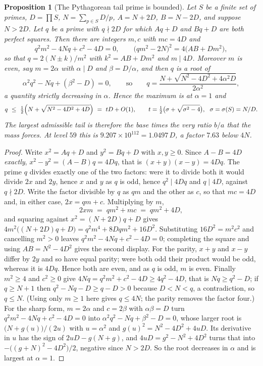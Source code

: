\documentclass[11pt]{article}
\newtheorem{proposition}[theorem]{Proposition}
\theoremstyle{definition}
\begin{document}
\begin{proposition}[The Pythagorean tail prime is bounded]\label{prop:tailbound}
Let $S$ be a finite set of primes, $D=\prod S$, $N=\sum_{p\in S}D/p$, $A=N+2D$, $B=N-2D$, and suppose
$N>2D$. Let $q$ be a prime with $q\nmid 2D$ for which $Aq+D$ and $Bq+D$ are both perfect squares. Then
there are integers $m,c$ with $mc=4D$ and
\[ q^2m^2-4Nq+c^2-4D=0, \qquad \bigl(qm^2-2N\bigr)^2=4\bigl(AB+Dm^2\bigr), \]
so that $q=2(N\pm k)/m^2$ with $k^2=AB+Dm^2$ and $m\mid 4D$. Moreover $m$ is \emph{even}, say
$m=2\alpha$ with $\alpha\mid D$ and $\beta=D/\alpha$, and then $q$ is a root of
\[ \alpha^2q^2-Nq+(\beta^2-D)=0, \qquad\text{so}\qquad
   q=\frac{N+\sqrt{N^2-4D^2+4\alpha^2D}}{2\alpha^2}, \]
a quantity strictly decreasing in $\alpha$. Hence the maximum is at $\alpha=1$ and
\[ q\ \le\ \tfrac12\Bigl(N+\sqrt{N^{2}-4D^{2}+4D}\Bigr)\ =\ tD+O(1),
   \qquad t=\tfrac12\bigl(\sigma+\sqrt{\sigma^{2}-4}\bigr),\ \ \sigma=\sigma(S)=N/D. \]
The largest admissible tail is therefore the base times the very ratio $b/a$ that the mass forces.
At level $59$ this is $9.207\times10^{112}=1.0497\,D$, a factor $7.63$ below $4N$.
\end{proposition}

\begin{proof}
Write $x^2=Aq+D$ and $y^2=Bq+D$ with $x,y\ge0$. Since $A-B=4D$ \emph{exactly},
$x^2-y^2=(A-B)q=4Dq$, that is $(x+y)(x-y)=4Dq$. The prime $q$ divides exactly one of the two factors:
were it to divide both it would divide $2x$ and $2y$, hence $x$ and $y$ as $q$ is odd, hence
$q^2\mid 4Dq$ and $q\mid 4D$, against $q\nmid2D$. Write the factor divisible by $q$ as $qm$ and the
other as $c$, so that $mc=4D$ and, in either case, $2x=qm+c$. Multiplying by $m$,
\[ 2xm\;=\;qm^2+mc\;=\;qm^2+4D, \]
and squaring against $x^2=(N+2D)q+D$ gives
$4m^2\bigl((N+2D)q+D\bigr)=q^2m^4+8Dqm^2+16D^2$. Substituting $16D^2=m^2c^2$ and cancelling $m^2>0$
leaves $q^2m^2-4Nq+c^2-4D=0$; completing the square and using $AB=N^2-4D^2$ gives the second display.
For the parity, $x+y$ and $x-y$ differ by $2y$ and so have equal parity; were both odd their
product would be odd, whereas it is $4Dq$. Hence both are even, and as $q$ is odd, $m$ is even.
Finally $m^2\ge4$ and $c^2\ge0$ give $4Nq=q^2m^2+c^2-4D\ge 4q^2-4D$, that is $Nq\ge q^2-D$; if
$q\ge N+1$ then $q^2-Nq-D\ge q-D>0$ because $D<N<q$, a contradiction, so $q\le N$. (Using only
$m\ge1$ here gives $q\le4N$; the parity removes the factor four.) For the sharp form, $m=2\alpha$ and
$c=2\beta$ with $\alpha\beta=D$ turn $q^2m^2-4Nq+c^2-4D=0$ into $\alpha^2q^2-Nq+\beta^2-D=0$, whose
larger root is $\bigl(N+g(u)\bigr)/(2u)$ with $u=\alpha^2$ and $g(u)^2=N^2-4D^2+4uD$. Its derivative
in $u$ has the sign of $2uD-g(N+g)$, and $4uD=g^2-N^2+4D^2$ turns that into
$-\bigl((g+N)^2-4D^2\bigr)/2$, negative since $N>2D$. So the root decreases in $\alpha$ and is
largest at $\alpha=1$.
\end{proof}
\end{document}
